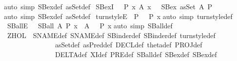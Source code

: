\begin{isabellebody}
%
\isadelimproof
%
\endisadelimproof
%
\isatagproof
{}\isamarkupfalse%
{\isacharparenleft}auto\ simp{\isacharcolon}\ SBex{\isacharunderscore}def\ asSet{\isacharunderscore}def{\isacharparenright}%
\endisatagproof
{\isafoldproof}%
%
\isadelimproof
\isanewline
%
\endisadelimproof
\isanewline
{}\isamarkupfalse%
\ SBex{\isacharunderscore}I{}\ {\isacharcolon}\ {\isachardoublequoteopen}{\isasymlbrakk}\ P\ x{\isacharsemicolon}\ A\ x\ {\isasymrbrakk}\ {\isasymLongrightarrow}\ SBex\ {\isacharparenleft}asSet\ A{\isacharparenright}\ P{\isachardoublequoteclose}\isanewline
%
\isadelimproof
%
\endisadelimproof
%
\isatagproof
{}\isamarkupfalse%
{\isacharparenleft}auto\ simp{\isacharcolon}\ SBex{\isacharunderscore}def\ asSet{\isacharunderscore}def{\isacharparenright}%
\endisatagproof
{\isafoldproof}%
%
\isadelimproof
\isanewline
%
\endisadelimproof
\isanewline
\isanewline
{}\isamarkupfalse%
\ turnstyle{\isacharunderscore}E{\isacharcolon}\ {\isachardoublequoteopen}{\isacharbar}{\isacharminus}\ P\ \ {\isasymLongrightarrow}\ P\ x{\isachardoublequoteclose}\isanewline
%
\isadelimproof
%
\endisadelimproof
%
\isatagproof
{}\isamarkupfalse%
{\isacharparenleft}auto\ simp{\isacharcolon}\ turnstyle{\isacharunderscore}def{\isacharparenright}%
\endisatagproof
{\isafoldproof}%
%
\isadelimproof
\isanewline
%
\endisadelimproof
\isanewline
{}\isamarkupfalse%
\ SBall{\isacharunderscore}E\ {\isacharcolon}\ {\isachardoublequoteopen}{\isasymlbrakk}\ SBall\ A\ P{\isacharsemicolon}\ x\ {\isacharcolon}\ A\ {\isasymrbrakk}\ {\isasymLongrightarrow}\ P\ x{\isachardoublequoteclose}\isanewline
%
\isadelimproof
%
\endisadelimproof
%
\isatagproof
{}\isamarkupfalse%
{\isacharparenleft}auto\ simp{\isacharcolon}\ SBall{\isacharunderscore}def{\isacharparenright}%
\endisatagproof
{\isafoldproof}%
%
\isadelimproof
%
\endisadelimproof
%
\isamarkuptrue%
\isamarkupfalse%
\ Z{}HOL\ {\isacharequal}\ SNAME{}{\isacharunderscore}def\ SNAME{\isacharunderscore}def\ SBinder{}{\isacharunderscore}def\ SBinder{\isacharunderscore}def\ turnstyle{\isacharunderscore}def\ \isanewline
\ \ \ \ \ \ \ \ \ \ \ \ \ \ \ asSet{\isacharunderscore}def\ asPred{\isacharunderscore}def\ DECL{\isacharunderscore}def\ theta{\isacharunderscore}def\ PROJ{\isacharunderscore}def\ \isanewline
\ \ \ \ \ \ \ \ \ \ \ \ \ \ \ DELTA{\isacharunderscore}def\ XI{\isacharunderscore}def\ PRE{\isacharunderscore}def\ SBall{\isacharunderscore}def\ SBex{\isacharunderscore}def\ SBex{}{\isacharunderscore}def\isanewline

\end{isabellebody}
